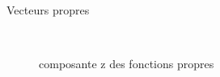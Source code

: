 \documentclass{beamer}
\begin{document}
\begin{frame}{Vecteurs propres}
\begin{figure}[H]
{		\ 
	}
	\caption{composante z des fonctions propres}
\end{figure}
\end{frame}
\end{document}
